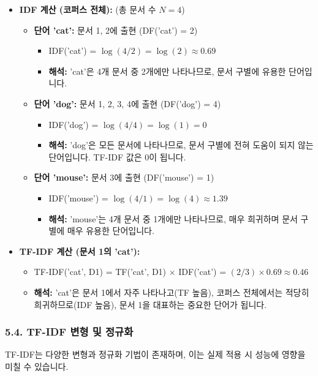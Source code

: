 \documentclass[11pt,a4paper]{article}
\theoremstyle{definition}
\begin{document}
\begin{itemize}
    \item \textbf{IDF 계산 (코퍼스 전체):} (총 문서 수 $N=4$)
    \begin{itemize}
        \item \textbf{단어 'cat':} 문서 1, 2에 출현 (DF('cat') = 2)
            \begin{itemize}
                \item IDF('cat') = $\log(4/2) = \log(2) \approx 0.69$
                \item \textbf{해석:} 'cat'은 4개 문서 중 2개에만 나타나므로, 문서 구별에 유용한 단어입니다.
            \end{itemize}
        \item \textbf{단어 'dog':} 문서 1, 2, 3, 4에 출현 (DF('dog') = 4)
            \begin{itemize}
                \item IDF('dog') = $\log(4/4) = \log(1) = 0$
                \item \textbf{해석:} 'dog'은 모든 문서에 나타나므로, 문서 구별에 전혀 도움이 되지 않는 단어입니다. TF-IDF 값은 0이 됩니다.
            \end{itemize}
        \item \textbf{단어 'mouse':} 문서 3에 출현 (DF('mouse') = 1)
            \begin{itemize}
                \item IDF('mouse') = $\log(4/1) = \log(4) \approx 1.39$
                \item \textbf{해석:} 'mouse'는 4개 문서 중 1개에만 나타나므로, 매우 희귀하며 문서 구별에 매우 유용한 단어입니다.
            \end{itemize}
    \end{itemize}

    \item \textbf{TF-IDF 계산 (문서 1의 'cat'):}
    \begin{itemize}
        \item TF-IDF('cat', D1) = TF('cat', D1) $\times$ IDF('cat') = $(2/3) \times 0.69 \approx 0.46$
        \item \textbf{해석:} 'cat'은 문서 1에서 자주 나타나고(TF 높음), 코퍼스 전체에서는 적당히 희귀하므로(IDF 높음), 문서 1을 대표하는 중요한 단어가 됩니다.
    \end{itemize}
\end{itemize}

\subsubsection{5.4. TF-IDF 변형 및 정규화}
TF-IDF는 다양한 변형과 정규화 기법이 존재하며, 이는 실제 적용 시 성능에 영향을 미칠 수 있습니다.
\end{document}
